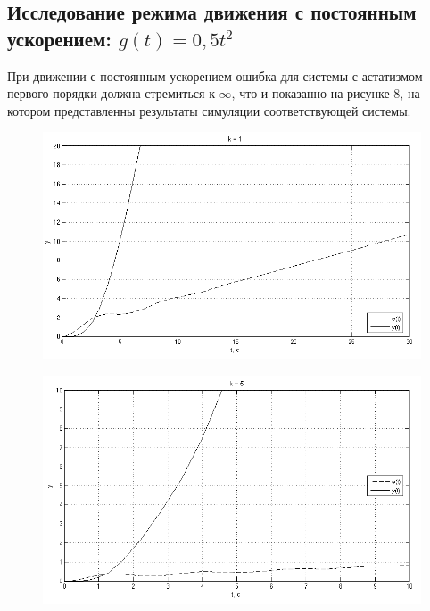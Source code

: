 \documentclass[a4paper, 11pt, russian]{article}
\begin{document}
    \subsection{Исследование режима движения с постоянным ускорением: $g(t) = 0,5t^2$}
    При движении с постоянным ускорением ошибка для системы с астатизмом первого порядки должна стремиться к $\infty$, что и показанно на рисунке 8, на котором представленны результаты симуляции соответствующей системы.
    \begin{figure}[ht!]
        \centering
        \includegraphics[scale = 0.75]{aInput1ast1k.png}
    \end{figure}
    \begin{figure}[ht!]
        \centering
        \includegraphics[scale = 0.75]{aInput1ast5k.png}
    \end{figure}
\end{document}
